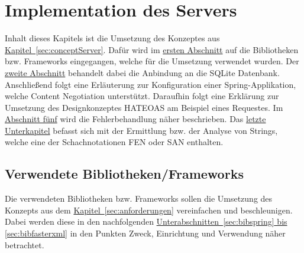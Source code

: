 
\chapter{Implementation des Servers}\label{chap:implementationServer}
Inhalt dieses Kapitels ist die Umsetzung des Konzeptes aus \hyperref[sec:conceptServer]{Kapitel~\ref{sec:conceptServer}}. Dafür wird im \hyperref[sec:librariesServer]{ersten Abschnitt} auf die Bibliotheken bzw. Frameworks eingegangen, welche für die Umsetzung verwendet wurden. Der \hyperref[sec:conncectionDB]{zweite Abschnitt} behandelt dabei die Anbindung an die SQLite Datenbank. Anschließend folgt eine Erläuterung zur Konfiguration einer Spring-Applikation, welche Content Negotiation unterstützt. Daraufhin folgt eine Erklärung zur Umsetzung des Designkonzeptes HATEOAS am Beispiel eines Requestes. Im \hyperref[sec:exceptionsHandling]{Abschnitt fünf} wird die Fehlerbehandlung näher beschrieben. Das \hyperref[sec:analyseFENSAN]{letzte Unterkapitel} befasst sich mit der Ermittlung bzw. der Analyse von Strings, welche eine der Schachnotationen \gls{FEN} oder \gls{SAN} enthalten.

\section{Verwendete Bibliotheken/Frameworks}\label{sec:librariesServer}
Die verwendeten Bibliotheken bzw. Frameworks sollen die Umsetzung des Konzepts aus dem \hyperref[sec:anforderungen]{Kapitel~\ref{sec:anforderungen}} vereinfachen und beschleunigen. Dabei werden diese in den nachfolgenden \hyperref[sec:bibspring, sec:bibfasterxml]{Unterabschnitten~\ref{sec:bibspring} bis \ref{sec:bibfasterxml}} in den Punkten Zweck, Einrichtung und Verwendung näher betrachtet. 

